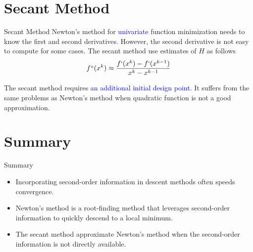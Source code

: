 \documentclass{beamer}
\begin{document}
\section{Secant Method}
\begin{frame}{Secant Method}
Newton's method for \textcolor{blue}{univariate} function minimization needs to know the first and second derivatives. However, the second derivative is not easy to compute for some cases. The secant method use estimates of $H$ as follows
\begin{gather*}
    f``(x^k) \approx \frac{f`(x^k) - f`(x^{k-1})} {x^k-x^{k-1}}
\end{gather*}

The secant method requires \textcolor{blue}{an additional initial design point}. It suffers from the same problems as Newton's method when quadratic function is not a good approximation.

\end{frame}



\section{Summary}
\begin{frame}{Summary}
    \begin{itemize}
        \item Incorporating second-order information in descent methods often speeds convergence.
        \item Newton’s method is a root-finding method that leverages second-order information to quickly descend to a local minimum.
        \item The secant method approximate Newton’s method when the second-order information is not directly available.
    \end{itemize}
\end{frame}
\end{document}
